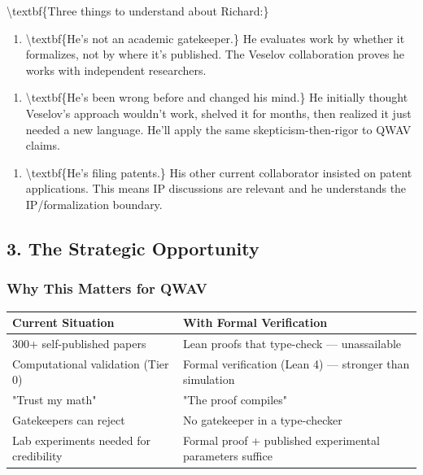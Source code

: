 \documentclass[11pt,a4paper]{article}
\begin{document}
\textbackslash{}textbf\{Three things to understand about Richard:\}

\begin{enumerate}
\item \textbackslash{}textbf\{He's not an academic gatekeeper.\} He evaluates work by whether it formalizes, not by where it's published. The Veselov collaboration proves he works with independent researchers.
\end{enumerate}


\begin{enumerate}
\item \textbackslash{}textbf\{He's been wrong before and changed his mind.\} He initially thought Veselov's approach wouldn't work, shelved it for months, then realized it just needed a new language. He'll apply the same skepticism-then-rigor to QWAV claims.
\end{enumerate}


\begin{enumerate}
\item \textbackslash{}textbf\{He's filing patents.\} His other current collaborator insisted on patent applications. This means IP discussions are relevant and he understands the IP/formalization boundary.
\end{enumerate}


\hrulefill


\subsection{3. The Strategic Opportunity}


\subsubsection{Why This Matters for QWAV}


\begin{tabular}{|l|l|}
\hline
\textbf{Current Situation} & \textbf{With Formal Verification} \\
\hline
300+ self-published papers & Lean proofs that type-check  --- unassailable \\
\hline
Computational validation (Tier 0) & Formal verification (Lean 4)  --- stronger than simulation \\
\hline
"Trust my math" & "The proof compiles" \\
\hline
Gatekeepers can reject & No gatekeeper in a type-checker \\
\hline
Lab experiments needed for credibility & Formal proof + published experimental parameters suffice \\
\hline
\end{tabular}
\end{document}
